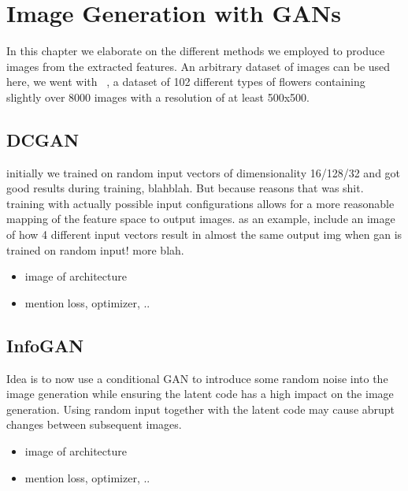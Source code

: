 \chapter{Image Generation with GANs}
    In this chapter we elaborate on the different methods we employed to produce images from the extracted features. An arbitrary dataset of images can be used here, we went with ~\cite{102flower}, a dataset of 102 different types of flowers containing slightly over 8000 images with a resolution of at least 500x500.
    
    \section{DCGAN}
        initially we trained on random input vectors of dimensionality 16/128/32 and got good results during training, blahblah. But because reasons that was shit. training with actually possible input configurations allows for a more reasonable mapping of the feature space to output images. as an example, include an image of how 4 different input vectors result in almost the same output img when gan is trained on random input! more blah.
        \begin{itemize}
            \item image of architecture
            \item mention loss, optimizer, ..
        \end{itemize}

    \section{InfoGAN}
        Idea is to now use a conditional GAN to introduce some random noise into the image generation while ensuring the latent code has a high impact on the image generation. Using random input together with the latent code may cause abrupt changes between subsequent images.
        \begin{itemize}
            \item image of architecture
            \item mention loss, optimizer, ..
        \end{itemize}

